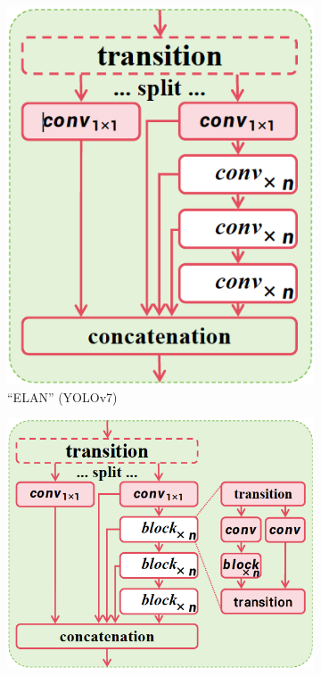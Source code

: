 \begin{figure}[H]
\begin{subfigure}[b]{0.30\textwidth}
        \includegraphics[width=\textwidth]{02-main/figures/ch2/ch2_yolo_07_architecture_elan.png}
        \caption{``ELAN'' (YOLOv7)}
        \label{fig:ch2_yolo_07_architecture_elan}
    \end{subfigure}
    \vspace{0.35cm}
    \begin{subfigure}[b]{0.45\textwidth}
        \centering
        \includegraphics[width=\textwidth]{02-main/figures/ch2/ch2_yolo_08_architecture_c3k2.png}

\end{subfigure}
\end{figure}
